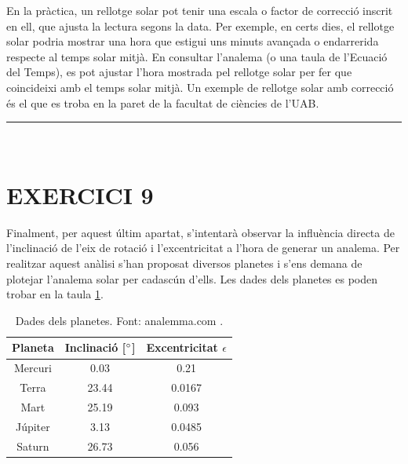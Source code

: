 \documentclass[a4paper, 11pt]{article}
\begin{document}
\vspace{2mm}

\noindent En la pràctica, un rellotge solar pot tenir una escala o factor de correcció inscrit en ell, que ajusta la lectura segons la data. Per exemple, en certs dies, el rellotge solar podria mostrar una hora que estigui uns minuts avançada o endarrerida respecte al temps solar mitjà. En consultar l'analema (o una taula de l'Ecuació del Temps), es pot ajustar l'hora mostrada pel rellotge solar per fer que coincideixi amb el temps solar mitjà. Un exemple de rellotge solar amb correcció és el que es troba en la paret de la facultat de ciències de l'UAB. 
\vspace{10mm}
\hrule\
\vspace{5mm}


\section*{EXERCICI 9}

\noindent Finalment, per aquest últim apartat, s'intentarà observar la influència directa de l'inclinació de l'eix de rotació i l'excentricitat a l'hora de generar un analema. Per realitzar aquest anàlisi s'han proposat diversos planetes i s'ens demana de plotejar l'analema solar per cadascún d'ells. Les dades dels planetes es poden trobar en la taula \ref{tab:planetes}.

\vspace{2mm}
\begin{table}[h!]
    \centering
    \begin{tabular}{|c|c|c|}
        \hline
        Planeta & Inclinació [$\degree$] & Excentricitat $\epsilon$ \\
        \hline
        Mercuri & 0.03 & 0.21 \\
        Terra & 23.44 & 0.0167 \\
        Mart & 25.19 & 0.093 \\
        Júpiter & 3.13 & 0.0485 \\
        Saturn & 26.73 & 0.056 \\
        \hline
    \end{tabular}
    \caption{Dades dels planetes. Font: analemma.com \cite{PLANETES}.}
    \label{tab:planetes}
\end{table}
\vspace{2mm}
\end{document}
